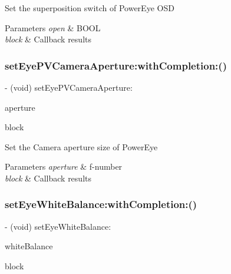 Set the superposition switch of Power\+Eye O\+SD


\begin{DoxyParams}{Parameters}
{\em open} & B\+O\+OL \\
\hline
{\em block} & Callback results \\
\hline
\end{DoxyParams}
\mbox{\label{interface_p_v_camera_af74626ebd2f1f2dc16f7acd6d3fb0a6b}} 
\subsubsection{\texorpdfstring{set\+Eye\+P\+V\+Camera\+Aperture\+:with\+Completion\+:()}{setEyePVCameraAperture:withCompletion:()}}
{\footnotesize\ttfamily -\/ (void) set\+Eye\+P\+V\+Camera\+Aperture\+: \begin{DoxyParamCaption}\item[{(P\+V\+Camera\+Aperture)}]{aperture }\item[{withCompletion:(P\+V\+Completion\+Block)}]{block }\end{DoxyParamCaption}}

Set the Camera aperture size of Power\+Eye


\begin{DoxyParams}{Parameters}
{\em aperture} & f-\/number \\
\hline
{\em block} & Callback results \\
\hline
\end{DoxyParams}
\mbox{\label{interface_p_v_camera_a961ca08ddc7a825839fbbe7c8ec6b2f8}} 
\subsubsection{\texorpdfstring{set\+Eye\+White\+Balance\+:with\+Completion\+:()}{setEyeWhiteBalance:withCompletion:()}}
{\footnotesize\ttfamily -\/ (void) set\+Eye\+White\+Balance\+: \begin{DoxyParamCaption}\item[{(N\+S\+Integer)}]{white\+Balance }\item[{withCompletion:(P\+V\+Completion\+Block)}]{block }\end{DoxyParamCaption}}

